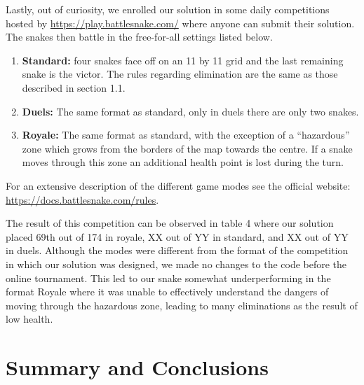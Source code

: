 \documentclass[a4paper,12pt]{article}
\begin{document}
Lastly, out of curiosity, we enrolled our solution in some daily competitions hosted by \url{https://play.battlesnake.com/} where anyone can submit their solution. The snakes then battle in the free-for-all settings listed below.

\begin{enumerate}
    \item \textbf{Standard:} four snakes face off on an 11 by 11 grid and the last remaining snake is the victor. The rules regarding elimination are the same as those described in section 1.1.
    \item \textbf{Duels:} The same format as standard, only in duels there are only two snakes.

    \item \textbf{Royale:} The same format as standard, with the exception of a “hazardous” zone which grows from the borders of the map towards the centre. If a snake moves through this zone an additional health point is lost during the turn.

\end{enumerate}
For an extensive description of the different game modes see the official website: \url{https://docs.battlesnake.com/rules}. 


The result of this competition can be observed in table 4 where our solution placed 69th out of 174 in royale, XX out of YY in standard, and XX out of YY in duels. Although the modes were different from the format of the competition in which our solution was designed, we made no changes to the code before the online tournament. This led to our snake somewhat underperforming in the format Royale where it was unable to effectively understand the dangers of moving through the hazardous zone, leading to many eliminations as the result of low health. 




\newpage
\section{Summary and Conclusions}
\label{sec:summary}



\clearpage


\end{document}
